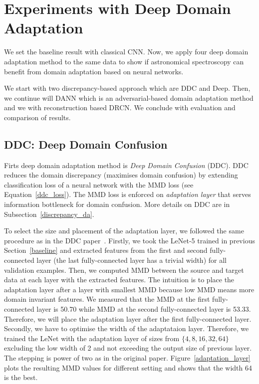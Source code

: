 \section{Experiments with Deep Domain Adaptation}

We set the baseline result with classical CNN.
Now, we apply four deep domain adaptation method to the same data
to show if astronomical spectroscopy can benefit from domain adaptation
based on neural networks.

We start with two discrepancy-based approach which are DDC and Deep.
Then, we continue will DANN
which is an adversarial-based domain adaptation method
and we with reconstruction based DRCN.
We conclude with evaluation and comparison of results.

\subsection{DDC: Deep Domain Confusion}

Firts deep domain adaptation method is \textit{Deep Domain Confusion} (DDC).
DDC reduces the domain discrepancy (maximises domain confusion)
by extending classification loss of a neural network with the MMD loss
(see Equation~\ref{ddc_loss}).
The MMD loss is enforced on \textit{adaptation layer}
that serves information bottleneck for domain confusion.
More details on DDC are in Subsection~\ref{discrepancy_da}.

To select the size and placement of the adaptation layer,
we followed the same procedure as in the DDC paper~\cite{tzeng2014}.
Firstly, we took the LeNet-5 trained in previous Section~\ref{baseline}
and extracted features from the first and second fully-connected layer
(the last fully-connected layer has a trivial width)
for all validation examples.
Then, we computed MMD between the source and target data at each layer with the extracted features.
The intuition is to place the adaptation layer after a layer with smallest MMD
because low MMD means more domain invariant features.
We measured that the MMD at the first fully-connected layer is 50.70
while MMD at the second fully-connected layer is 53.33.
Therefore, we will place the adaptation layer after the first fully-connected layer.
Secondly, we have to optimise the width of the adaptataion layer.
Therefore, we trained the LeNet with the adaptation layer of sizes
from \(\{4, 8, 16, 32, 64\}\) excluding the low width of 2
and not exceeding the output size of previous layer.
The stepping is power of two as in the original paper.
Figure~\ref{adaptation_layer} plots the resulting MMD values for different setting
and shows that the width 64 is the best.

